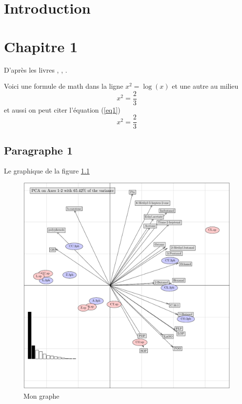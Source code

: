 \documentclass[12pt,french]{thesis}
\begin{document}
\mainmatter




\chapter*{Introduction}
\chapter{Chapitre 1}

D'après les livres \cite{schaeffer99}, \cite{jenkins2004}, \cite{caillois1}.

Voici une formule de math dans la ligne $x^2=\log(x)$ et une autre au milieu
$$x^2=\displaystyle\frac{2}{3}$$
et
aussi on peut citer l'\'equation (\ref{eq1})
\begin{equation}
x^2=\displaystyle\frac{2}{3} \label{eq1}
\end{equation}
\section{Paragraphe 1}

Le graphique de la figure \ref{fig1}

\begin{figure}[h]
\centering
\includegraphics[scale=.5]{acp1}
\caption{Mon graphe \label{fig1}}
\end{figure}
\end{document}
